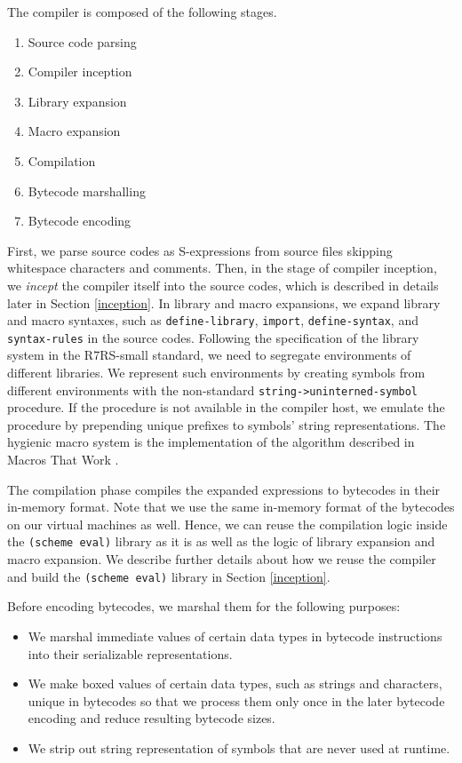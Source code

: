 \documentclass[sigplan, anonymous, review]{acmart}
\begin{document}
The compiler is composed of the following stages.

\begin{enumerate}
  \item Source code parsing
  \item Compiler inception
  \item Library expansion
  \item Macro expansion
  \item Compilation
  \item Bytecode marshalling
  \item Bytecode encoding
\end{enumerate}

First, we parse source codes as S-expressions from source
files skipping whitespace characters and comments.
Then, in the stage of compiler inception, we \textit{incept} the compiler
itself into the source codes, which is described in details later in
Section \ref{inception}.
In library and macro expansions, we expand library and macro
syntaxes, such as \texttt{define-library}, \texttt{import},
\texttt{define-syntax}, and \texttt{syntax-rules} in the source codes.
Following the specification of the library system in the R7RS-small
standard, we need to segregate environments of different libraries.
We represent such environments by creating symbols from
different environments with the non-standard
\texttt{string->uninterned-symbol} procedure.
If the procedure is not available in the compiler host, we emulate
the procedure by prepending unique prefixes to symbols' string
representations.
The hygienic macro system is the implementation of the
algorithm described in Macros That Work \cite{macrosthatwork}.

The compilation phase compiles the expanded expressions to
bytecodes in their in-memory format. Note that we use the same
in-memory format of the bytecodes on our virtual machines as well.
Hence, we can reuse the
compilation logic inside the \texttt{(scheme eval)} library as it is
as well as the logic of library expansion and macro expansion.
We describe further details about how we reuse the compiler and build
the \texttt{(scheme eval)} library in Section \ref{inception}.

Before encoding bytecodes, we marshal them for the following purposes:

\begin{itemize}
  \item We marshal immediate values of certain data types in bytecode
    instructions into their serializable representations.
  \item We make boxed values of certain data types, such as strings and
    characters, unique in bytecodes so that we process them only once
    in the later bytecode encoding and reduce resulting bytecode sizes.
  \item We strip out string representation of symbols that are never used
    at runtime.
\end{itemize}
\end{document}
